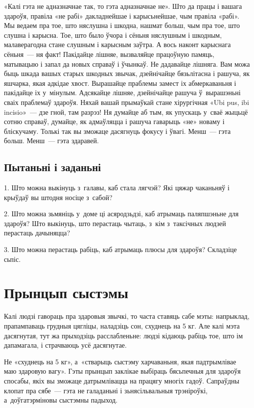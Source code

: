 «Калі гэта не адназначнае так, то гэта адназначнае не». Што да працы і вашага здароўя, правіла «не рабі» дакладнейшае і карысьнейшае, чым правіла «рабі». Мы ведаем пра тое, што няслушна і шкодна, нашмат больш, чым пра тое, што слушна і карысна. Тое, што было ўчора і сёньня няслушным і шкодным, малаверагодна стане слушным і карысным заўтра. А вось наконт карыснага сёньня~--- ня факт! Пакідайце лішняе, вызваляйце працоўную памяць, матывацыю і запал да новых справаў і ўчынкаў. Не дадавайце лішняга. Вам можа быць шкада вашых старых шкодных звычак, дзейнічайце бязьлітасна і рашуча, як яшчарка, якая адкідае хвост. Вырашайце праблемы замест іх абмеркаваньня і пакідайце іх у~мінулым. Адсякайце лішняе, дзейнічайце рашуча ў~вырашэньні сваіх праблемаў здароўя. Няхай вашай прымаўкай стане хірургічная «Ubi pus, ibi incisio»~--- дзе гной, там разрэз! Ня думайце аб тым, як упускаць у~сваё жыцьцё сотню справаў, думайце, як адмаўляцца і рашуча гаварыць «не» новаму і бліскучаму. Толькі так вы зможаце дасягнуць фокусу і ўвагі. Менш~--- гэта больш. Менш~--- гэта здаравей.

\subsection*{Пытаньні і заданьні}

1. Што можна выкінуць з~галавы, каб стала лягчэй? Які цяжар чаканьняў і крыўдаў вы штодня носіце з~сабой?

2. Што можна зьмяніць у~доме ці асяродзьдзі, каб атрымаць паляпшэньне для здароўя? Што выкінуць, што перастаць чытаць, з~кім з~таксічных людзей перастаць дачыняцца?

3. Што можна перастаць рабіць, каб атрымаць плюсы для здароўя? Складзіце сьпіс.


\section{Прынцып сыстэмы}

Калі людзі гавораць пра здаровыя звычкі, то часта ставяць сабе мэты: напрыклад, прапампаваць грудныя цягліцы, наладзіць сон, схуднець на 5 кг. Але калі мэта дасягнутая, тут жа прыходзіць расслабленьне: людзі кідаюць рабіць тое, што ім дапамагала, і страчваюць усё дасягнутае.


Не «схуднець на 5 кг», а~«стварыць сыстэму харчаваньня, якая падтрымлівае маю здаровую вагу». Гэты прынцып заклікае выбіраць бясьпечныя для здароўя спосабы, якіх вы зможаце датрымлівацца на працягу многіх гадоў. Сапраўдны клопат пра сябе~--- гэта не галаданьні і зьнясільвальныя трэніроўкі, а~доўгатэрміновы сыстэмны падыход.

